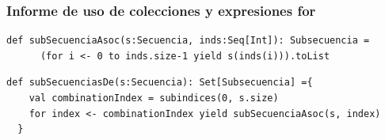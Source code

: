 \documentclass[12pt, a4paper]{article}
\begin{document}
\subsubsection{Informe de uso de colecciones y expresiones for}
\begin{lstlisting}[caption=Código en Scala para la funcion subSecuenciaAsoc, label=lst:scala_code]
  def subSecuenciaAsoc(s:Secuencia, inds:Seq[Int]): Subsecuencia = 
      (for i <- 0 to inds.size-1 yield s(inds(i))).toList
      \end{lstlisting}
      \begin{lstlisting}[caption=Código en Scala para la funcion subSecuenciasDe, label=lst:scala_code]
  def subSecuenciasDe(s:Secuencia): Set[Subsecuencia] ={
    val combinationIndex = subindices(0, s.size) 
    for index <- combinationIndex yield subSecuenciaAsoc(s, index)
  }
            \end{lstlisting}
\end{document}
